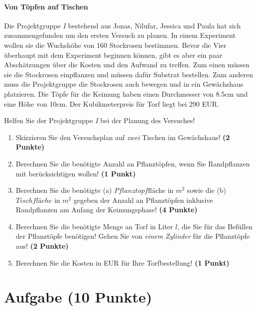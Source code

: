 \documentclass[a4paper, 9pt]{scrartcl}\usepackage[]{graphicx}\usepackage[]{xcolor}
\begin{document}
\ifcollection
\paragraph{Von Töpfen auf Tischen}
\fi



Die Projektgruppe \textit{I} bestehend aus Jonas, Nilufar, Jessica und Paula hat sich zusammengefunden um den ersten Versuch zu planen. In einem Experiment wollen sie die Wuchshöhe von 160 Stockrosen bestimmen. Bevor die Vier überhaupt mit dem Experiment beginnen können, gibt es aber ein paar Abschätzungen über die Kosten und den Aufwand zu treffen. Zum einen müssen sie die Stockrosen einpflanzen und müssen dafür Substrat bestellen. Zum anderen muss die Projektgruppe die Stockrosen auch bewegen und in ein Gewächshaus platzieren. Die Töpfe für die Keimung haben
einen Durchmesser von 8.5cm und eine Höhe von 10cm. Der Kubikmeterpreis für Torf liegt bei 290 EUR.

\vspace{1Ex}

Helfen Sie der Projektgruppe \textit{I} bei der Planung des Versuches!

\begin{enumerate}
\item Skizzieren Sie den Versuchsplan auf \textit{zwei} Tischen im Gewächshaus! \textbf{(2 Punkte)}
\item Berechnen Sie die benötigte Anzahl an Pflanztöpfen, wenn Sie Randpflanzen mit berücksichtigen wollen! \textbf{(1 Punkt)}
\item Berechnen Sie die benötigte (a) $Pflanztopf$fläche in $m^2$ sowie die (b) $Tischfläche$ in $m^2$ gegeben der Anzahl an Pflanztöpfen inklusive Randpflanzen am Anfang der Keimungsphase! \textbf{(4 Punkte)}
\item Berechnen Sie die benötigte Menge an Torf in Liter $l$, die Sie für das Befüllen der Pflanztöpfe benötigen! Gehen Sie von \textit{einem Zylinder} für die Pflanztöpfe aus!  \textbf{(2 Punkte)}
\item Berechnen Sie die Kosten in EUR für Ihre Torfbestellung! \textbf{(1 Punkt)}
\end{enumerate}



 
\clearpage

\section{Aufgabe \hfill (10 Punkte)}
\end{document}
